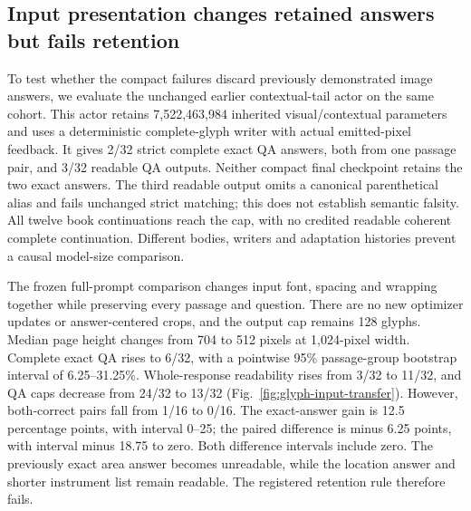 
\subsection*{Input presentation changes retained answers but fails retention}
To test whether the compact failures discard previously demonstrated image
answers, we evaluate the unchanged earlier contextual-tail actor on the same
cohort. This actor retains 7,522,463,984 inherited visual/contextual parameters
and uses a deterministic complete-glyph writer with actual emitted-pixel
feedback. It gives 2/32 strict complete exact QA answers, both from one
passage pair, and 3/32 readable QA outputs. Neither compact final checkpoint
retains the two exact answers. The third readable output omits a canonical
parenthetical alias and fails unchanged strict matching; this does not
establish semantic falsity. All twelve book continuations reach the cap,
with no credited readable coherent complete continuation. Different bodies,
writers and adaptation histories prevent a causal model-size comparison.

The frozen full-prompt comparison changes input font, spacing and wrapping
together while preserving every passage and question. There are no new
optimizer updates or answer-centered crops, and the output cap remains 128
glyphs. Median page height changes from 704 to 512 pixels at 1,024-pixel width.
Complete exact QA rises to 6/32, with a pointwise 95\% passage-group bootstrap
interval of 6.25--31.25\%. Whole-response readability rises from 3/32 to 11/32,
and QA caps decrease from 24/32 to 13/32 (Fig.~\ref{fig:glyph-input-transfer}).
However, both-correct pairs fall from 1/16 to 0/16. The exact-answer gain is
12.5 percentage points, with interval 0--25; the paired difference is minus
6.25 points, with interval minus 18.75 to zero. Both difference intervals
include zero. The previously exact area answer becomes unreadable, while
the location answer and shorter instrument list remain readable. The
registered retention rule therefore fails.


